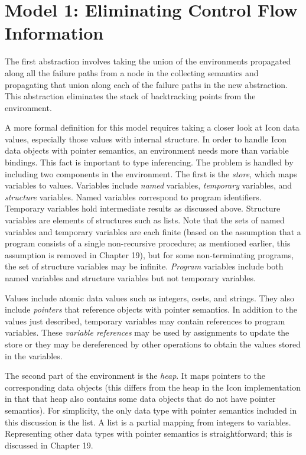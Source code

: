 \section*{Model 1: Eliminating Control Flow Information}

The first abstraction involves taking the union of the environments
propagated along all the failure paths from a node in the collecting
semantics and propagating that union along each of the failure paths
in the new abstraction. This abstraction eliminates the stack of
backtracking points from the environment.

A more formal definition for this model requires taking a closer look
at Icon data values, especially those values with internal
structure. In order to handle Icon data objects with pointer
semantics, an environment needs more than variable bindings. This fact
is important to type inferencing. The problem is handled by including
two components in the environment. The first is the \textit{store},
which maps variables to values. Variables include \textit{named}
variables, \textit{temporary} variables, and \textit{structure}
variables. Named variables correspond to program
identifiers. Temporary variables hold intermediate results as
discussed above. Structure variables are elements of structures such
as lists. Note that the sets of named variables and temporary
variables are each finite (based on the assumption that a program
consists of a single non-recursive procedure; as mentioned earlier,
this assumption is removed in Chapter 19), but for some
non-terminating programs, the set of structure variables may be
infinite.  \textit{Program} variables include both named variables and
structure variables but not temporary variables.

Values include atomic data values such as integers, csets, and
strings. They also include \textit{pointers} that reference objects
with pointer semantics. In addition to the values just described,
temporary variables may contain references to program variables. These
\textit{variable references} may be used by assignments to update the
store or they may be dereferenced by other operations to obtain the
values stored in the variables.

The second part of the environment is the \textit{heap}. It maps
pointers to the corresponding data objects (this differs from the heap
in the Icon implementation in that that heap also contains some data
objects that do not have pointer semantics). For simplicity, the only
data type with pointer semantics included in this discussion is the
list.  A list is a partial mapping from integers to
variables. Representing other data types with pointer semantics is
straightforward; this is discussed in Chapter 19.

